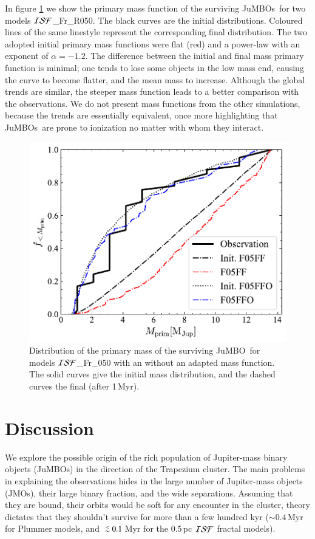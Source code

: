 \documentclass[submission,phys]{lib/SciPost}
\def\aplt{\ {\raise-.5ex\hbox{$\buildrel<\over\sim$}}\ }
\newcommand{\jumbo}{\mbox{JuMBO}}
\newcommand{\jumbos}{\mbox{JuMBOs}}
\begin{document}
In figure \ref{Fig:Mdistr_F05} we show the primary mass function of
the surviving \jumbos\, for two models ${\cal ISF}$\_Fr\_R050.  
The black curves are the initial distributions. Coloured lines of the 
same linestyle represent the corresponding final distribution. The 
two adopted initial primary mass functions were flat (red) and a 
power-law with an exponent of $\alpha=-1.2$. The difference between the 
initial and final mass primary function is minimal;  one tends to lose 
some objects in the low mass end, causing the curve to become flatter, 
and the mean mass to increase.  Although the global trends are similar, 
the steeper mass function leads to a better comparison with the observations.  
We do not present mass functions from the other simulations, because the trends 
are essentially  equivalent, once more highlighting that \jumbos\ are prone to
ionization no matter with whom they interact.

\begin{figure}
    \centering
    \includegraphics[width=0.75\columnwidth]{figures/Frac_FF_GenObs_mprim.pdf}
    \caption{Distribution of the primary mass of the surviving
      \jumbo\, for models ${\cal ISF}$\_Fr\_050 with an without an adapted mass
      function. The solid curves give the initial mass distribution,
      and the dashed curves the final (after 1\,Myr).}
         \label{Fig:Mdistr_F05}
\end{figure}

\section{Discussion}\label{Sect:Discussion}

We explore the possible origin of the rich population of Jupiter-mass
binary objects (\jumbos) in the direction of the Trapezium cluster.
The main problems in explaining the observations hides in the large
number of Jupiter-mass objects (JMOs), their large binary fraction, and the
wide separations. Assuming that they are bound, their orbits would be
soft for any encounter in the cluster, theory dictates that they shouldn't
survive for more than a few hundred kyr ($\sim 0.4$\,Myr for Plummer
models, and $\aplt 0.1$\,Myr for the 0.5\,pc ${\cal ISF}$ fractal
models).
\end{document}
